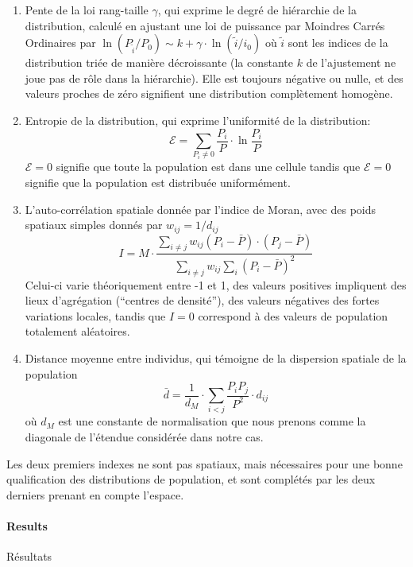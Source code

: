 {\begin{enumerate}
\item Pente de la loi rang-taille $\gamma$, qui exprime le degré de hiérarchie de la distribution, calculé en ajustant une loi de puissance par Moindres Carrés Ordinaires par $\ln \left( P_{\tilde{i}}/P_0\right) \sim k + \gamma\cdot \ln \left(\tilde{i}/i_0\right)$ où $\tilde{i}$ sont les indices de la distribution triée de manière décroissante (la constante $k$ de l'ajustement ne joue pas de rôle dans la hiérarchie). Elle est toujours négative ou nulle, et des valeurs proches de zéro signifient une distribution complètement homogène.
\item Entropie de la distribution, qui exprime l'uniformité de la distribution:
\begin{equation}
\mathcal{E} = \sum_{P_i\neq 0}\frac{P_i}{P}\cdot \ln{\frac{P_i}{P}}
\end{equation}
$\mathcal{E}=0$ signifie que toute la population est dans une cellule tandis que $\mathcal{E}=0$ signifie que la population est distribuée uniformément.
\item L'auto-corrélation spatiale donnée par l'indice de Moran, avec des poids spatiaux simples donnés par $w_{ij} = 1/d_{ij}$
\[
I = M \cdot \frac{\sum_{i\neq j} w_{ij} \left(P_i - \bar{P}\right)\cdot\left(P_j - \bar{P}\right)}{\sum_{i\neq j} w_{ij} \sum_{i}{\left( P_i - \bar{P}\right)}^2}
\]
Celui-ci varie théoriquement entre -1 et 1, des valeurs positives impliquent des lieux d'agrégation (``centres de densité''), des valeurs négatives des fortes variations locales, tandis que $I=0$ correspond à des valeurs de population totalement aléatoires.
\item Distance moyenne entre individus, qui témoigne de la dispersion spatiale de la population
\[
\bar{d} = \frac{1}{d_M}\cdot \sum_{i<j} \frac{P_i P_j}{P^2} \cdot d_{ij}
\]
où $d_M$ est une constante de normalisation que nous prenons comme la diagonale de l'étendue considérée dans notre cas.
\end{enumerate}
}

Les deux premiers indexes ne sont pas spatiaux, mais nécessaires pour une bonne qualification des distributions de population, et sont complétés par les deux derniers prenant en compte l'espace.


\paragraph{Results}{Résultats}



